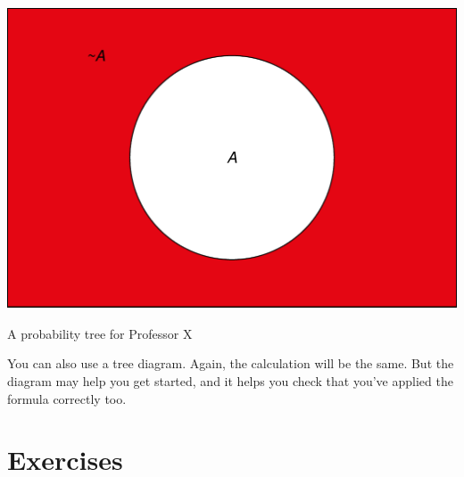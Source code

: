 \documentclass[justified]{tufte-book}
\theoremstyle{definition}
\theoremstyle{definition}
\theoremstyle{definition}
\theoremstyle{definition}
\theoremstyle{remark}
\begin{document}
\begin{marginfigure}
\includegraphics{_main_files/figure-latex/unnamed-chunk-67-1} \caption[A probability tree for Professor X]{A probability tree for Professor X}\label{fig:unnamed-chunk-67}
\end{marginfigure}

You can also use a tree diagram. Again, the calculation will be the same. But the diagram may help you get started, and it helps you check that you've applied the formula correctly too.

\hypertarget{exercises-5}{%
\section*{Exercises}\label{exercises-5}}
\end{document}
